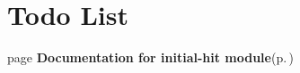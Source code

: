 \section{Todo List}\label{todo}
\label{todo__todo000001}
 \begin{description}
\item[page {\bf Documentation for initial-hit module}{\rm (p.\,\pageref{index})} ]\end{description}
